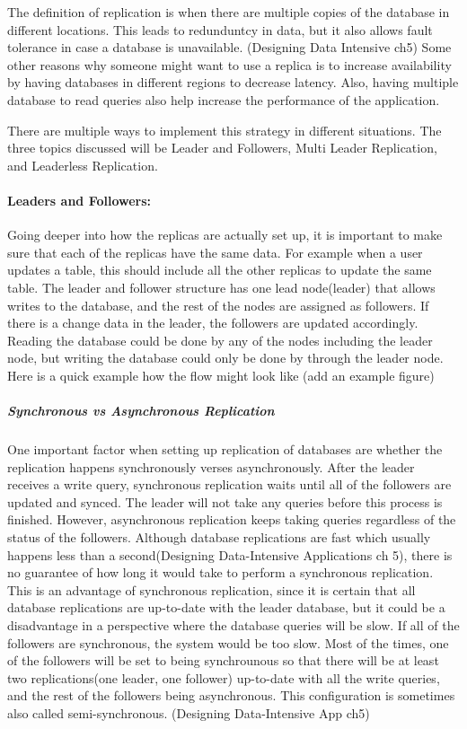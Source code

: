 The definition of replication is when there are multiple copies of the database in different locations. This leads to redunduntcy in data, but it also allows fault tolerance in case a database is unavailable. (Designing Data Intensive ch5) Some other reasons why someone might want to use a replica is to increase availability by having databases in different regions to decrease latency. Also, having multiple database to read queries also help increase the performance of the application. 

There are multiple ways to implement this strategy in different situations. The three topics discussed will be Leader and Followers, Multi Leader Replication, and Leaderless Replication.

\paragraph{Leaders and Followers:}
Going deeper into how the replicas are actually set up, it is important to make sure that each of the replicas have the same data. For example when a user updates a table, this should include all the other replicas to update the same table. The leader and follower structure has one lead node(leader) that allows writes to the database, and the rest of the nodes are assigned as followers. If there is a change data in the leader, the followers are updated accordingly. Reading the database could be done by any of the nodes including the leader node, but writing the database could only be done by through the leader node. Here is a quick example how the flow might look like
(add an example figure)

\subparagraph{Synchronous vs Asynchronous Replication}
One important factor when setting up replication of databases are whether the replication happens synchronously verses asynchronously. After the leader receives a write query, synchronous replication waits until all of the followers are updated and synced. The leader will not take any queries before this process is finished. However, asynchronous replication keeps taking queries regardless of the status of the followers. Although database replications are fast which usually happens less than a second(Designing Data-Intensive Applications ch 5), there is no guarantee of how long it would take to perform a synchronous replication. This is an advantage of synchronous replication, since it is certain that all database replications are up-to-date with the leader database, but it could be a disadvantage in a perspective where the database queries will be slow. If all of the followers are synchronous, the system would be too slow. Most of the times, one of the followers will be set to being synchrounous so that there will be at least two replications(one leader, one follower) up-to-date with all the write queries, and the rest of the followers being asynchronous. This configuration is sometimes also called semi-synchronous. (Designing Data-Intensive App ch5) 

